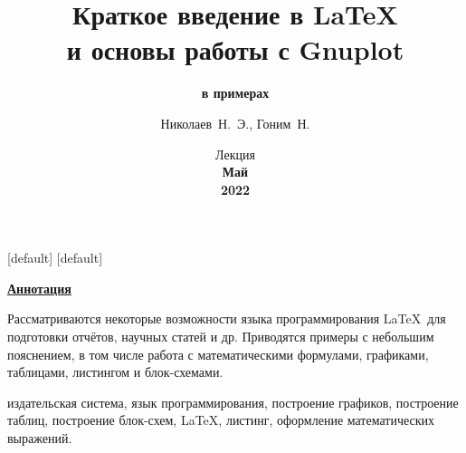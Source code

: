 \documentclass[%
10pt,
pdf,
intlimits,
sumlimits,
namelimits,
fleqn,
russian,
noamsthm,
hyperref={unicode},
utf8,
usepdftitle={false}, %
\ifdefined\aspectXVIxIX
aspectratio=169,
\else\fi
\ifdefined\printable
handout,
\else\fi
]{beamer}
\makeatletter
\newenvironment{withoutheadandfootlines}{
        \setbeamertemplate{headline}[default]
        \def\beamer@entrycode{\vspace*{-\headheight}}
        \setbeamertemplate{footline}[default]
        \def\beamer@entrycode{\vspace*{+\footheight}}
    }{}
\makeatother
\begin{document}

\title[ЛиГ]{%
   {%
      Краткое введение в \LaTeX \\
		и основы работы с Gnuplot
   }
}

\subtitle[П]{%
   {\bfseries в примерах}
}

\author[Николаев~Н.~Э. и~др.]{Николаев~Н.~Э., Гоним~Н.}


\subject{\LaTeX}

\date[ИФИТ]{%
   {\normalsize Лекция} \\[2ex]
   {\footnotesize\bf Май} \\
   {\footnotesize\bf 2022}
}

\begin{withoutheadandfootlines}
   \begin{frame}[squeeze]
		\vspace*{-5ex}
      \maketitle
   \end{frame}
\end{withoutheadandfootlines}


\begin{frame}[squeeze]
	\label{frame:annotation}
	\vspace\headheight
	\vspace*{-0.5ex}
	{\centering\bfseries%
		\large\underline{Аннотация} \\
	}
	\medskip

	\footnotesize\quad Рассматриваются некоторые возможности языка программирования \LaTeX\ для подготовки отчётов, научных статей и др. Приводятся примеры с небольшим пояснением, в том числе работа с математическими формулами, графиками, таблицами, листингом и блок\nobreak-схемами.
	\medskip

	\footnotesize{} издательская система, язык программирования, построение графиков, построение таблиц, построение блок\nobreak-схем, \LaTeX, листинг, оформление математических выражений.
\end{frame}
\end{document}
